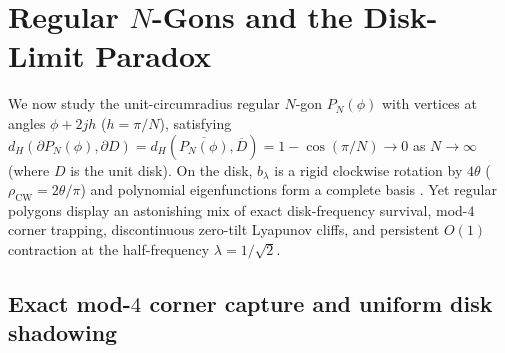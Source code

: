 \documentclass[11pt,reqno]{amsart}
\theoremstyle{definition}
\theoremstyle{remark}
\begin{document}
\section{Regular \texorpdfstring{$N$}{N}-Gons and the Disk-Limit Paradox}\label{sec:regular}

We now study the unit-circumradius regular $N$-gon $P_N(\phi)$ with vertices at angles $\phi + 2jh$ ($h = \pi/N$), satisfying $d_H(\partial P_N(\phi), \partial D) = d_H(\overline{P_N(\phi)}, \overline{D}) = 1 - \cos(\pi/N) \to 0$ as $N \to \infty$ (where $D$ is the unit disk). On the disk, $b_\lambda$ is a rigid clockwise rotation by $4\theta$ ($\rho_{\mathrm{CW}} = 2\theta/\pi$) and polynomial eigenfunctions form a complete basis \cite{Aleksandryan1960}. Yet regular polygons display an astonishing mix of exact disk-frequency survival, mod-$4$ corner trapping, discontinuous zero-tilt Lyapunov cliffs, and persistent $O(1)$ contraction at the half-frequency $\lambda = 1/\sqrt{2}$.

\subsection{Exact \texorpdfstring{mod-$4$}{mod-4} corner capture and uniform disk shadowing}
\end{document}
